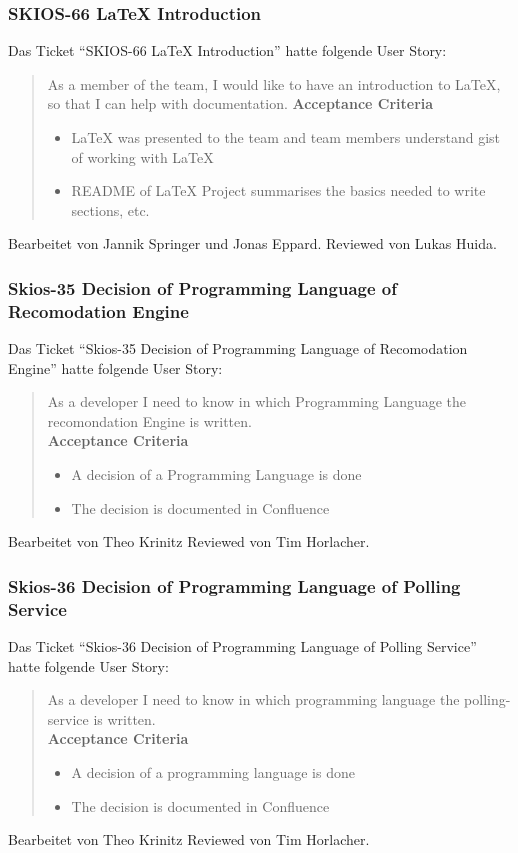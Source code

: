 \subsubsection{SKIOS-66 LaTeX Introduction}
Das Ticket \enquote{SKIOS-66 LaTeX Introduction} hatte folgende User Story:
\begin{quotation}
    As a member of the team, I would like to have an introduction to LaTeX, so that I can help with documentation.
\textbf{Acceptance Criteria}
\begin{itemize}
    \item LaTeX was presented to the team and team members understand gist of working with LaTeX
    \item README of LaTeX Project summarises the basics needed to write sections, etc.
\end{itemize}
\end{quotation}
Bearbeitet von Jannik Springer und Jonas Eppard.
Reviewed von Lukas Huida.

\subsubsection{Skios-35 Decision of Programming Language of Recomodation Engine}
Das Ticket \enquote{Skios-35 Decision of Programming Language of Recomodation Engine} hatte folgende User Story:
\begin{quotation}
    As a developer I need to know in which Programming Language the recomondation Engine is written. \\
    \textbf{Acceptance Criteria}
    \begin{itemize}
        \item A decision of a Programming Language is done
        \item The decision is documented in Confluence
    \end{itemize}    
\end{quotation}
Bearbeitet von Theo Krinitz
Reviewed von Tim Horlacher.

\subsubsection{Skios-36 Decision of Programming Language of Polling Service}
Das Ticket \enquote{Skios-36 Decision of Programming Language of Polling Service} hatte folgende User Story:
\begin{quotation}
    As a developer I need to know in which programming language the polling-service is written. \\
    \textbf{Acceptance Criteria}
    \begin{itemize}
        \item A decision of a programming language is done
        \item The decision is documented in Confluence
    \end{itemize}
\end{quotation}
Bearbeitet von Theo Krinitz
Reviewed von Tim Horlacher.

